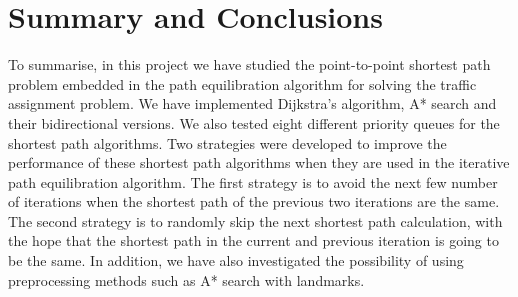 \chapter{Summary and Conclusions} \label{chap:conclusions}
To summarise,
in this project we have studied the point-to-point shortest path problem embedded in the path equilibration algorithm for solving the traffic assignment problem.
We have implemented Dijkstra's algorithm, A* search and their bidirectional versions.
We also tested eight different priority queues for the shortest path algorithms.
Two strategies were developed to improve the performance of these shortest path algorithms when they are used in the iterative path equilibration algorithm.
The first strategy is to avoid the next few number of iterations
when the shortest path of the previous two iterations are the same.
The second strategy is to randomly skip the next shortest path calculation,
with the hope that the shortest path in the current and previous iteration is going to be the same.
In addition,
we have also investigated the possibility of using preprocessing methods such as A* search with landmarks.

